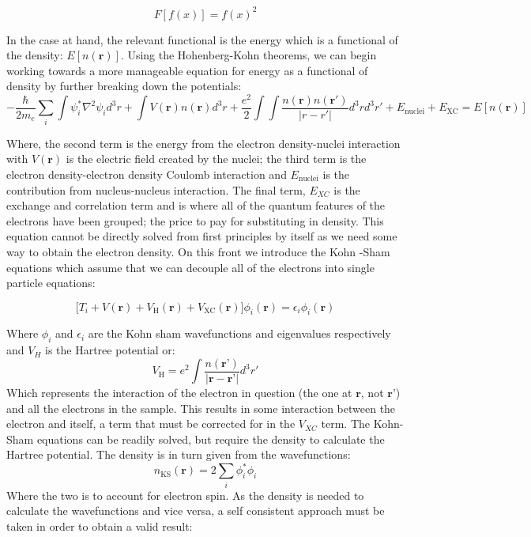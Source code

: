 \begin{equation}
F[f(x)] = f(x)^2 
\end{equation}

 In the case at hand, the relevant functional is the energy which is a functional of the density: $E[n(\textbf{r})]$.  Using the Hohenberg-Kohn theorems, we can begin working towards a more manageable equation for energy as a functional of density by further breaking down the potentials: 
\begin{equation}
-\frac{\hbar}{2m_e} \sum_{i} \int \psi_i^* \nabla^2\psi_id^3r + \int V(\textbf{r})n(\textbf{r})d^3r + \frac{e^2}{2} \int \int \frac{n(\textbf{r})n(\textbf{r}')}{|r-r'|}d^3r d^3r' + E_{\mathrm{nuclei}} + E_{\mathrm{XC}} = E[n(\textbf{r})]
\end{equation}

Where, the second term is the energy from the electron density-nuclei interaction with $V(\textbf{r})$ is the electric field created by the nuclei; the third term is the electron density-electron density Coulomb interaction and $E_{\mathrm{nuclei}}$ is the contribution from nucleus-nucleus interaction.  The final term, $E_{XC}$ is the exchange and correlation term and is where all of the quantum features of the electrons have been grouped; the price to pay for substituting in density. This equation cannot be directly solved from first principles by itself as we need some way to obtain the electron density.  On this front we introduce the Kohn -Sham equations which assume that we can decouple all of the electrons into single particle equations: 

\begin{equation}
    \bigg[T_i + V(\textbf{r}) + V_{\mathrm{H}}(\textbf{r}) + V_{\mathrm{XC}}(\textbf{r})\bigg] \phi_i(\textbf{r}) = \epsilon_i \phi_i(\textbf{r})
    \label{ks_eq}
\end{equation}

Where $\phi_i$ and $\epsilon_i$ are the Kohn sham wavefunctions and eigenvalues respectively and $V_H$ is the Hartree potential or: 
\begin{equation}
    V_\mathrm{H} = e^2 \int \frac{n(\textbf{r'})}{|\textbf{r}-\textbf{r'}|}d^3r'
\end{equation}
Which represents the interaction of the electron in question (the one at $\textbf{r}$, not $\textbf{r'}$) and all the electrons in the sample.  This results in some interaction between the electron and itself, a term that must be corrected for in the $V_{XC}$ term.  The Kohn-Sham equations can  be readily solved, but require the density to calculate the Hartree potential.  The density is in turn given from the wavefunctions: 
\begin{equation}
	n_{\mathrm{KS}}(\textbf{r}) = 2 \sum_{i} \phi_i^*\phi_i
	\label{KS_density}
\end{equation}
Where the two is to account for electron spin.  As the density is needed to calculate the wavefunctions and vice versa, a self consistent approach must be taken in order to obtain a valid result:  

